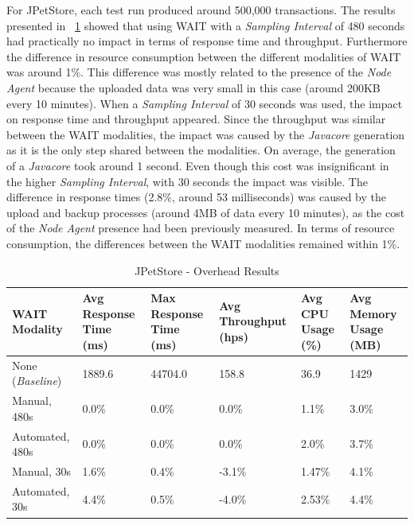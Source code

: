 \documentclass[runningheads,a4paper]{llncs}
\begin{document}
For JPetStore, each test run produced around 500,000 transactions. The results
presented in \tablename ~\ref{PetStore1} showed that using WAIT with a
\emph{Sampling Interval} of 480 seconds had practically no impact in terms of
response time and throughput. Furthermore the difference in resource consumption
between the different modalities of WAIT was around 1\%.  This difference was
mostly related to the presence of the \emph{Node Agent} because the uploaded
data was very small in this case (around 200KB every 10 minutes). When a
\emph{Sampling Interval} of 30 seconds was used, the impact on response time
and throughput appeared. Since the throughput was similar between the WAIT
modalities, the impact was caused by the \emph{Javacore} generation as it is
the only step shared between the modalities. On average, the generation of a
\emph{Javacore} took around 1 second. Even though this cost was insignificant in
the higher \emph{Sampling Interval}, with 30 seconds the impact was visible. The
difference in response times (2.8\%, around 53 milliseconds) was caused by the
upload and backup processes (around 4MB of data every 10 minutes), as the cost
of the \emph{Node Agent} presence had been previously measured. In terms of resource 
consumption, the differences between the WAIT modalities remained within 1\%.

\vspace{-2pt}
\begin{table}[!h]
\caption{JPetStore - Overhead Results}
\label{PetStore1}
\centering
\begin{tabular}{p{}|p{}|p{}|p{}|p{}|p{}}
\hline
\bfseries WAIT Modality & \bfseries Avg Response Time (ms)& \bfseries Max
Response Time (ms)& \bfseries Avg Throughput (hps)& \bfseries Avg CPU Usage
(\%) & \bfseries Avg Memory Usage (MB)\\
\hline
None (\emph{Baseline}) 	& 1889.6	& 44704.0	& 158.8 	& 36.9 		& 1429\\
Manual, 480s 			& 0.0\% 	& 0.0\%		& 0.0\%		& 1.1\% 	& 3.0\%\\
Automated, 480s 		& 0.0\%		& 0.0\%		& 0.0\% 	& 2.0\% 	& 3.7\%\\
Manual, 30s 			& 1.6\%		& 0.4\%		& -3.1\% 	& 1.47\% 	& 4.1\%\\
Automated, 30s 			& 4.4\%		& 0.5\%		& -4.0\% 	& 2.53\% 	& 4.4\%\\
\hline
\end{tabular}
\end{table}
\vspace{-2pt}
\end{document}
